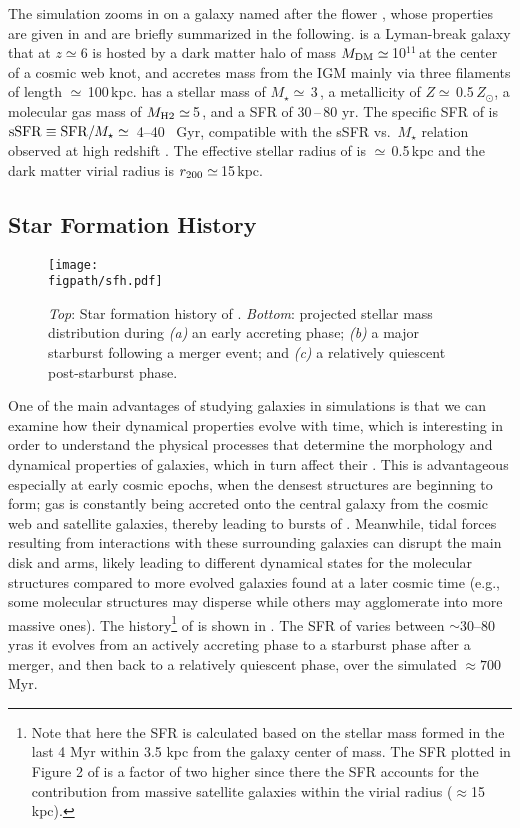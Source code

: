 \IfFileExists{emulateapjlegacy.cls}{\documentclass[iop]{emulateapjlegacy}}{\documentclass[iop]{emulateapj}}
\def\figpath{./Fig}
\begin{document}
The simulation zooms in on a galaxy named after the flower \flower, whose properties are given in \citet{Pallottini17a} and are briefly summarized in the following. \flower is a Lyman-break galaxy that at $z\simeq 6$ is hosted by a dark matter halo of mass $M_{\rm DM}\simeq$\,10$^{11}$\,\Msun at the center of a cosmic web knot, and accretes mass from the IGM mainly via three filaments of length $\simeq$\,100\,kpc. \flower has a stellar mass of $M_\star\simeq$\,3\,\Msun, a metallicity of $Z\simeq$\,0.5\,$Z_{\odot}$, a molecular gas mass of $M_{\rm H2}\simeq$\,5\,\Msun, and a SFR of 30\,--\,80\,\Msun\,yr\pmOne.
%
The specific SFR of \flower is ${\rm sSFR} \equiv {\rm SFR}/M_{\star} \simeq$~4--40 ~Gyr\pmOne, compatible with the sSFR vs.\ $M_{\star}$ relation observed at high redshift \citep{Jiang16a}. The effective stellar radius of \flower is $\simeq$\,0.5\,kpc and the dark matter virial radius is $r_{\rm 200}\simeq$\,15\,kpc.

\subsection{Star Formation History} \label{sec:sfh}

\begin{figure*}[hptb]
\centering
\texttt{[image: \\figpath/sfh.pdf]}
\caption{
    {\it Top}: Star formation history of \flower. {\it Bottom}:
    projected stellar mass distribution during {\it (a)} an early
    accreting phase;  {\it (b)} a major starburst following a merger
    event; and {\it (c)} a relatively quiescent post-starburst
    phase.
\label{fig:SFH}}
\end{figure*}

One of the main advantages of studying galaxies in simulations is that we can examine how their dynamical properties evolve with time, which is interesting in order to understand the physical processes that determine the morphology and dynamical properties of galaxies, which in turn affect their \SF.
%
This is advantageous especially at early cosmic epochs, when the densest structures are beginning to form; gas is constantly being accreted onto the central galaxy from the cosmic web and satellite galaxies, thereby leading to bursts of \SF.
%
Meanwhile, tidal forces resulting from interactions with these surrounding galaxies can disrupt the main disk and arms, likely leading to different dynamical states for the molecular structures compared to more evolved galaxies found at a later cosmic time (e.g., some molecular structures may disperse while others may agglomerate into more massive ones).
%
The \SF history\footnote{Note that here the SFR is calculated based on the stellar mass formed in the last 4 Myr within 3.5 kpc from the galaxy center of mass. The SFR plotted in Figure 2 of \citet{Pallottini17b} is a factor of two higher since there the SFR accounts for the contribution from massive satellite galaxies within the virial radius ($\approx$15\,kpc).} of \flower is shown in . The SFR of \flower varies between $\sim$30--80 \Msun\,yr\pmOne as it evolves from an actively accreting phase to a starburst phase after a merger, and then back to a relatively quiescent phase, over the simulated $\approx 700$\,Myr.
\end{document}
